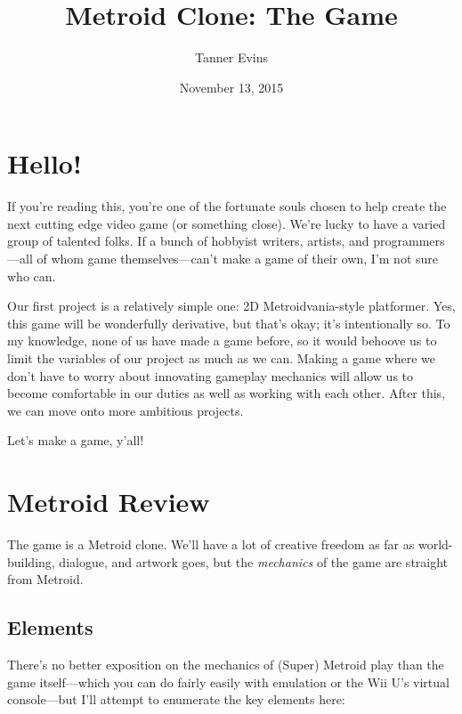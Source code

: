 \documentclass{article}
\title{Metroid Clone: The Game}
\author{Tanner Evins}
\date{November 13, 2015}
\begin{document}
\maketitle

\section{Hello!}
If you're reading this, you're one of the fortunate souls chosen to help create the next cutting edge video game (or something close). We're lucky to have a varied group of talented folks. If a bunch of hobbyist writers, artists, and programmers---all of whom game themselves---can't make a game of their own, I'm not sure who can.

Our first project is a relatively simple one: 2D Metroidvania-style platformer. Yes, this game will be wonderfully derivative, but that's okay; it's intentionally so. To my knowledge, none of us have made a game before, so it would behoove us to limit the variables of our project as much as we can. Making a game where we don't have to worry about innovating gameplay mechanics will allow us to become comfortable in our duties as well as working with each other. After this, we can move onto more ambitious projects.

Let's make a game, y'all!

\section{Metroid Review}
The game is a Metroid clone. We'll have a lot of creative freedom as far as world-building, dialogue, and artwork goes, but the \emph{mechanics} of the game are straight from Metroid.

\subsection*{Elements}

There's no better exposition on the mechanics of (Super) Metroid play than the game itself---which you can do fairly easily with emulation or the Wii U's virtual console---but I'll attempt to enumerate the key elements here:
\end{document}
